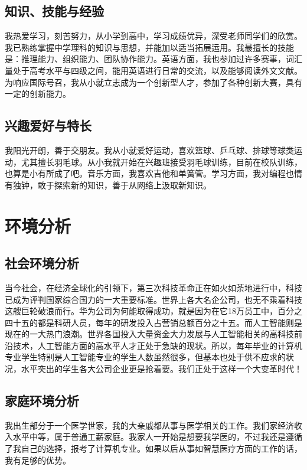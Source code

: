 \documentclass{article}
\begin{document}
\subsection{知识、技能与经验}
我热爱学习，刻苦努力，从小学到高中，学习成绩优异，深受老师同学们的欣赏。我已熟练掌握中学理科的知识与思想，并能加以适当拓展运用。我最擅长的技能是：推理能力、组织能力、团队协作能力。英语方面，我也参加过许多赛事，词汇量处于高考水平与四级之间，能用英语进行日常的交流，以及能够阅读外文文献。为响应国际号召，我从小就立志成为一个创新型人才，参加了各种创新大赛，具有一定的创新能力。\par
\subsection{兴趣爱好与特长}
我阳光开朗，善于交朋友。我从小就爱好运动，喜欢篮球、乒乓球、排球等球类运动，尤其擅长羽毛球。从小我就开始在兴趣班接受羽毛球训练，目前在校队训练，也算是小有所成了吧。音乐方面，我喜欢吉他和单簧管。学习方面，我对编程也情有独钟，敢于探索新的知识，善于从网络上汲取新知识。\par
\section{环境分析}

\subsection{社会环境分析}
当今社会，在经济全球化的引领下，第三次科技革命正在如火如荼地进行中，科技已成为评判国家综合国力的一大重要标准。世界上各大名企公司，也无不乘着科技这艘巨轮破浪而行。华为公司为何能取得成功，就是因为在它18万员工中，百分之四十五的都是科研人员，每年的研发投入占营销总额百分之十五。而人工智能则是现在的一大热门浪潮。世界各国投入大量资金大力发展与人工智能相关的高科技前沿技术，人工智能方面的高水平人才正处于急缺的现状。所以，每年毕业的计算机专业学生特别是人工智能专业的学生人数虽然很多，但基本也处于供不应求的状况，水平突出的学生各大公司企业更是抢着要。我们正处于这样一个大变革时代！\par
\subsection{家庭环境分析}
我出生部分于一个医学世家，我的大亲戚都从事与医学相关的工作。我们家经济收入水平中等，属于普通工薪家庭。我家人一开始是想要我学医的，不过我还是遵循了我自己的选择，报考了计算机专业。如果以后从事如智慧医疗方面的工作的话，我有足够的优势。\par
\end{document}
